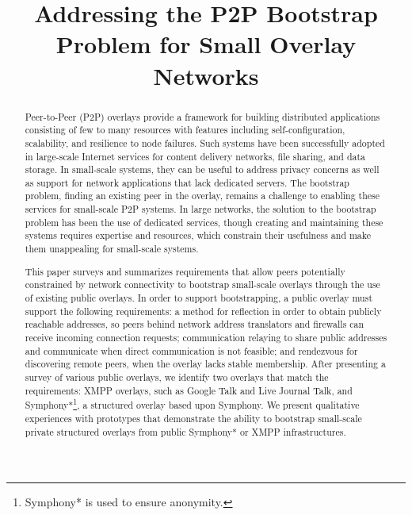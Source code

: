 \documentclass[conference]{IEEEtran}
\begin{document}
\title{Addressing the P2P Bootstrap Problem for Small Overlay Networks}

\author{
}

\maketitle

\begin{abstract}

Peer-to-Peer (P2P) overlays provide a framework for building distributed
applications consisting of few to many resources with features including
self-configuration, scalability, and resilience to node failures.  Such systems
have been successfully adopted in large-scale Internet services for content
delivery networks, file sharing, and data storage.  In small-scale systems,
they can be useful to address privacy concerns as well as support for network
applications that lack dedicated servers.  The bootstrap problem, finding an
existing peer in the overlay, remains a challenge to enabling these services
for small-scale P2P systems.  In large networks, the solution to the bootstrap
problem has been the use of dedicated services, though creating and maintaining
these systems requires expertise and resources, which constrain their
usefulness and make them unappealing for small-scale systems.

This paper surveys and summarizes requirements that allow peers potentially
constrained by network connectivity to bootstrap small-scale overlays through
the use of existing public overlays.  In order to support bootstrapping, a
public overlay must support the following requirements: a method for reflection
in order to obtain publicly reachable addresses, so peers behind network
address translators and firewalls can receive incoming connection requests;
communication relaying to share public addresses and communicate when direct
communication is not feasible; and rendezvous for discovering remote peers,
when the overlay lacks stable membership.  After presenting a survey of various
public overlays, we identify two overlays that match the requirements:  XMPP
overlays, such as Google Talk and Live Journal Talk, and Symphony*\footnote{Symphony* is used to ensure anonymity.}, a structured
overlay based upon Symphony.  We present qualitative experiences with
prototypes that demonstrate the ability to bootstrap small-scale private
structured overlays from public Symphony* or XMPP infrastructures.

\end{abstract}
\end{document}
